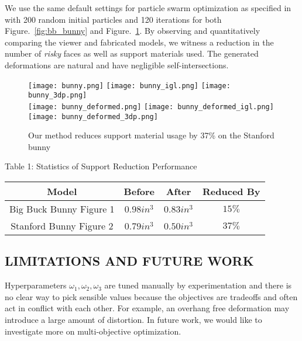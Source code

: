 We use the same default settings for particle swarm optimization as specified in \cite{jacobson_matryoshka_2017} with 200 random initial particles and 120 iterations for both Figure.~\ref{fig:bb_bunny} and Figure.~\ref{fig:bunny}. By observing and quantitatively comparing the viewer and fabricated models, we witness a reduction in the number of \textit{risky} faces as well as support materials used. The generated deformations are natural and have negligible self-intersections.

\begin{figure}[ht]
    \centering
    \texttt{[image: bunny.png]}
    \texttt{[image: bunny\_igl.png]} 
    \texttt{[image: bunny\_3dp.png]}
    \\
    \texttt{[image: bunny\_deformed.png]} 
    \texttt{[image: bunny\_deformed\_igl.png]} 
    \texttt{[image: bunny\_deformed\_3dp.png]}
    \caption{Our method reduces support material usage by 37\% on the Stanford bunny}
    \label{fig:bunny}
\end{figure}

\begin{center}
    Table 1: Statistics of Support Reduction Performance
\end{center}

\begin{center}
    \begin{tabular}{ |c|c|c|c| } 
    \hline
    \textbf{Model} & \textbf{Before} & \textbf{After} & \textbf{Reduced By}\\
    \hline
    Big Buck Bunny Figure 1 & $0.98 in^{3}$ & $0.83 in^{3}$ & $15\%$\\ 
    \hline
    Stanford Bunny Figure 2 & $0.79in^{3}$ & $0.50in^{3}$ & $37\%$ \\ 
    \hline
    \end{tabular}
\end{center}

\begin{center}
   
\end{center}


\subsection*{LIMITATIONS AND FUTURE WORK}

Hyperparameters $\omega_1, \omega_2, \omega_3$ are tuned manually by experimentation and there is no clear way to pick sensible values because the objectives are tradeoffs and often act in conflict with each other. For example, an overhang free deformation may introduce a large amount of distortion. In future work, we would like to investigate more on multi-objective optimization.


